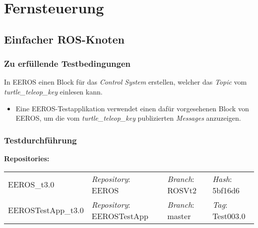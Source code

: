 \section{Fernsteuerung}
\subsection{Einfacher ROS-Knoten}
\subsubsection{Zu erfüllende Testbedingungen}
In EEROS einen Block für das \textit{Control System} erstellen, welcher das \textit{Topic} vom \textit{turtle\_teleop\_key} einlesen kann.
\begin{itemize}
\item Eine EEROS-Testapplikation verwendet einen dafür vorgesehenen Block von EEROS, um die vom \textit{turtle\_teleop\_key} publizierten \textit{Messages} anzuzeigen.
\end{itemize}

\subsubsection{Testdurchführung}
\textbf{Repositories:} \\
\begin{tabular}
  { l						| l			 							l								 l								}

  EEROS\_t3.0				& \textit{Repository}: EEROS			& \textit{Branch}: ROSVt2		& \textit{Hash}: 5bf16d6		\\
  EEROSTestApp\_t3.0		& \textit{Repository}: EEROSTestApp	& \textit{Branch}: master		& \textit{Tag}: Test003.0		\\
\end{tabular}

